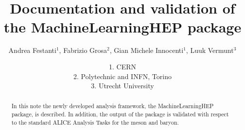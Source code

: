 \documentclass[ALICE,manyauthors]{ALICE_analysis_notes}
\begin{document}
%

\linenumbers

%
%
\begin{titlepage}
%
\PHdate{\today}
%
\title{Documentation and validation of the MachineLearningHEP package}
%
\author{Andrea Festanti$^{1}$, Fabrizio Grosa$^{2}$, Gian Michele Innocenti$^{1}$, Luuk Vermunt$^{3}$}
\author{
1. CERN\\
2. Polytechnic and INFN, Torino\\
3. Utrecht University\\
}
%
%
\begin{abstract}
In this note the newly developed analysis framework, the MachineLearningHEP package, is described. In addition, the output of the package is validated with respect to the standard ALICE Analysis Tasks for the \Ds meson and \Lc baryon.
\end{abstract}
\end{titlepage}
\setcounter{page}{2}
%
\clearpage
{}
\tableofcontents
\clearpage
\clearpage
 
\clearpage

\clearpage


\end{document}
